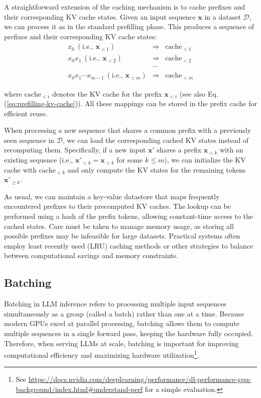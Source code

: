 A straightforward extension of the caching mechanism is to cache prefixes and their corresponding KV cache states. Given an input sequence $\mathbf{x}$ in a dataset $\mathcal{D}$, we can process it as in the standard prefilling phase. This produces a sequence of prefixes and their corresponding KV cache states:
\begin{eqnarray}
x_0\ (\text{i.e., } \mathbf{x}_{<1}) & \Rightarrow & \mathrm{cache}_{<1} \nonumber \\
x_0 x_1\ (\text{i.e., } \mathbf{x}_{<2}) & \Rightarrow & \mathrm{cache}_{<2} \nonumber \\
& \cdots & \nonumber \\
x_0 x_1 \cdots x_{m-1}\ (\text{i.e., } \mathbf{x}_{<m}) & \Rightarrow & \mathrm{cache}_{<m} \nonumber
\end{eqnarray}

\noindent where $\mathrm{cache}_{<i}$ denotes the KV cache for the prefix $\mathbf{x}_{<i}$ (see also Eq. (\ref{eq:prefilling-kv-cache})). All these mappings can be stored in the prefix cache for efficient reuse.

When processing a new sequence that shares a common prefix with a previously seen sequence in $\mathcal{D}$, we can load the corresponding cached KV states instead of recomputing them. Specifically, if a new input $\mathbf{x}'$ shares a prefix $\mathbf{x}_{<k}$ with an existing sequence (i.e., $\mathbf{x}'_{<k} = \mathbf{x}_{<k}$ for some $k \le m$), we can initialize the KV cache with $\mathrm{cache}_{<k}$ and only compute the KV states for the remaining tokens $\mathbf{x}'_{\ge k}$.

As usual, we can maintain a key-value datastore that maps frequently encountered prefixes to their precomputed KV caches. The lookup can be performed using a hash of the prefix tokens, allowing constant-time access to the cached states. Care must be taken to manage memory usage, as storing all possible prefixes may be infeasible for large datasets. Practical systems often employ least recently used (LRU) caching methods or other strategies to balance between computational savings and memory constraints.

\subsection{Batching}

Batching in LLM inference refers to processing multiple input sequences simultaneously as a group (called a batch) rather than one at a time. Because modern GPUs excel at parallel processing, batching allows them to compute multiple sequences in a single forward pass, keeping the hardware fully occupied. Therefore, when serving LLMs at scale, batching is important for improving computational efficiency and maximizing hardware utilization\footnote{See \url{https://docs.nvidia.com/deeplearning/performance/dl-performance-gpu-background/index.html\#understand-perf} for a simple evaluation.}.

